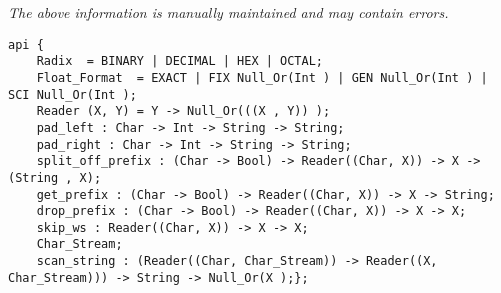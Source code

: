 \label{api:Number\_String}

{\tiny \it The above information is manually maintained and may contain errors.}
\begin{verbatim}
api {
    Radix  = BINARY | DECIMAL | HEX | OCTAL;
    Float_Format  = EXACT | FIX Null_Or(Int ) | GEN Null_Or(Int ) | SCI Null_Or(Int );
    Reader (X, Y) = Y -> Null_Or(((X , Y)) );
    pad_left : Char -> Int -> String -> String;
    pad_right : Char -> Int -> String -> String;
    split_off_prefix : (Char -> Bool) -> Reader((Char, X)) -> X -> (String , X);
    get_prefix : (Char -> Bool) -> Reader((Char, X)) -> X -> String;
    drop_prefix : (Char -> Bool) -> Reader((Char, X)) -> X -> X;
    skip_ws : Reader((Char, X)) -> X -> X;
    Char_Stream;
    scan_string : (Reader((Char, Char_Stream)) -> Reader((X, Char_Stream))) -> String -> Null_Or(X );};
\end{verbatim}
